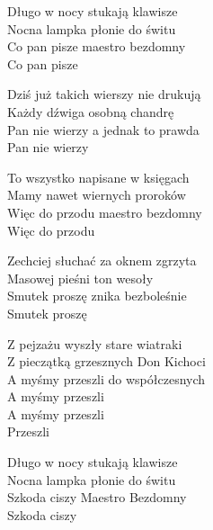 \begin{text}
    Długo w nocy stukają klawisze\\
    Nocna lampka płonie do świtu\\
    Co pan pisze maestro bezdomny\\
    Co pan pisze

    Dziś już takich wierszy nie drukują\\
    Każdy dźwiga osobną chandrę\\
    Pan nie wierzy a jednak to prawda\\
    Pan nie wierzy

    To wszystko napisane w księgach\\
    Mamy nawet wiernych proroków\\
    Więc do przodu maestro bezdomny\\
    Więc do przodu

    Zechciej słuchać za oknem zgrzyta\\
    Masowej pieśni ton wesoły\\
    Smutek proszę znika bezboleśnie\\
    Smutek proszę

    Z pejzażu wyszły stare wiatraki\\
    Z pieczątką grzesznych Don Kichoci\\
    A myśmy przeszli do współczesnych\\
    A myśmy przeszli\\
    A myśmy przeszli\\
    Przeszli

    Długo w nocy stukają klawisze\\
    Nocna lampka płonie do świtu\\
    Szkoda ciszy Maestro Bezdomny\\
    Szkoda ciszy
\end{text}
\begin{chord}

\end{chord}